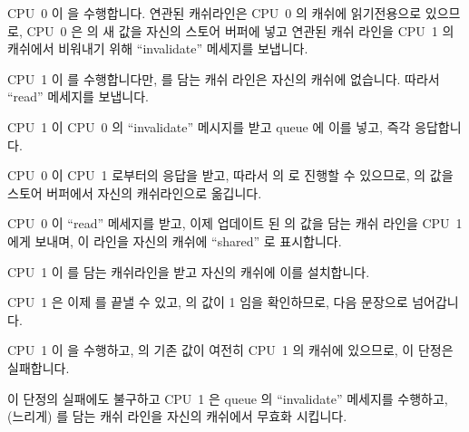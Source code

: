 \begin{fcvref}
\begin{sequence}
\item	CPU~0 이  을 수행합니다.
	연관된 캐쉬라인은 CPU~0 의 캐쉬에 읽기전용으로 있으므로, CPU~0 은
	 의 새 값을 자신의 스토어 버퍼에 넣고 연관된 캐쉬 라인을 CPU~1
	의 캐쉬에서 비워내기 위해 ``invalidate'' 메세지를 보냅니다.
	\label{seq:app:whymb:Invalidate Queues and Memory Barriers}
\item	CPU~1 이  를 수행합니다만,  를 담는
	캐쉬 라인은 자신의 캐쉬에 없습니다.
	따라서 ``read'' 메세지를 보냅니다.
\item	CPU~1 이 CPU~0 의 ``invalidate'' 메시지를 받고 queue 에 이를 넣고, 즉각
	응답합니다.
\item	CPU~0 이 CPU~1 로부터의 응답을 받고, 따라서  의
	 로 진행할 수 있으므로,  의 값을 스토어 버퍼에서
	자신의 캐쉬라인으로 옮깁니다.

\iffalse

\item	CPU~0 executes \co{a = 1}.  The corresponding
	cache line is read-only in
	CPU~0's cache, so CPU~0 places the new value of \qco{a} in its
	store buffer and transmits an ``invalidate'' message in order
	to flush the corresponding cache line from CPU~1's cache.
	\label{seq:app:whymb:Invalidate Queues and Memory Barriers}
\item	CPU~1 executes \co{while (b == 0) continue}, but the cache line
	containing \qco{b} is not in its cache.
	It therefore transmits a ``read'' message.
\item	CPU~1 receives CPU~0's ``invalidate'' message, queues it, and
	immediately responds to it.
\item	CPU~0 receives the response from CPU~1, and is therefore free
	to proceed past the \co{smp_mb()} on \clnref{mb} above, moving
	the value of \qco{a} from its store buffer to its cache line.
\item	CPU~0 executes \co{b = 1}.
	It already owns this cache line (in other words, the cache line
	is already in either the ``modified'' or the ``exclusive'' state),
	so it stores the new value of \qco{b} in its cache line.

\fi

\item	CPU~0 이 ``read'' 메세지를 받고, 이제 업데이트 된  의 값을 담는
	캐쉬 라인을 CPU~1 에게 보내며, 이 라인을 자신의 캐쉬에 ``shared'' 로
	표시합니다.
\item	CPU~1 이  를 담는 캐쉬라인을 받고 자신의 캐쉬에 이를 설치합니다.
\item	CPU~1 은 이제  를 끝낼 수 있고,  의
	값이 1 임을 확인하므로, 다음 문장으로 넘어갑니다.
\item	CPU~1 이  을 수행하고,  의 기존 값이 여전히
	CPU~1 의 캐쉬에 있으므로, 이 단정은 실패합니다.
\item	이 단정의 실패에도 불구하고 CPU~1 은 queue 의 ``invalidate'' 메세지를
	수행하고, (느리게)  를 담는 캐쉬 라인을 자신의 캐쉬에서 무효화
	시킵니다.


\end{sequence}
\end{fcvref}
